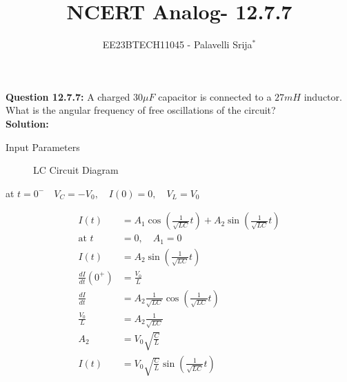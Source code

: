 \documentclass[journal,12pt,twocolumn]{IEEEtran}
\theoremstyle{remark}
\begin{document}

\vspace{3cm}

\title{NCERT Analog- 12.7.7}
\author{EE23BTECH11045 - Palavelli Srija$^{*}$}

\maketitle

\bigskip

\renewcommand{\thefigure}{\theenumi}
\renewcommand{\thetable}{\theenumi}

\vspace{3cm}
\textbf{Question 12.7.7:} 
 A charged $30 \mu F$ capacitor is connected to a $27 mH$ inductor. What is the angular frequency of free oscillations of the circuit?\\
\textbf{Solution: }
\begin{table}[h!]
    \centering
    
    \caption{Input Parameters}
    \label{tab:table_omega}
\end{table}
\begin{figure}[H]
    \centering
    
    \caption{LC Circuit Diagram}
    \label{fig:omega2}
\end{figure}
at $t=0^-\quad V_C=-V_0,\quad I(0)=0,\quad V_L=V_0$

\begin{align}
 I(t) &= A_1 \cos\left(\frac{1}{\sqrt{LC}} t\right) + A_2 \sin\left(\frac{1}{\sqrt{LC}} t\right) \\
 \text{at } t &= 0, \quad  A_1=0 \\
 I(t) &= A_2 \sin\left(\frac{1}{\sqrt{LC}} t\right) \\
 \frac{dI}{dt}(0^+) &= \frac{V_0}{L} \\
 \frac{dI}{dt} &= A_2 \frac{1}{\sqrt{LC}} \cos\left(\frac{1}{\sqrt{LC}} t\right) \\
 \frac{V_0}{L} &= A_2 \frac{1}{\sqrt{LC}} \\
 A_2 &= V_0 \sqrt{\frac{C}{L}} \\
 I(t) &= V_0 \sqrt{\frac{C}{L}} \sin\left(\frac{1}{\sqrt{LC}} t\right)
\end{align}
\end{document}
